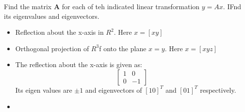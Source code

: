 Find the matrix $\boldsymbol{A}$ for each of teh indicated linear transformation $y=Ax$. IFnd its eigenvalues and eigenvectors.
\begin{itemize}
	\item Reflection about the x-axis in $R^2$. Here $x=\left[x y \right]$
	\item Orthogonal projection of $R^3$f onto the plane $x=y$. Here $x=\left[x y z\right]$
\end{itemize}
\begin{itemize}
	\item The reflection about the x-axis is given as:
	\begin{equation*}
	\boxed{
		\begin{bmatrix}
			1&0\\0&-1
		\end{bmatrix}
		}
	\end{equation*}
	Its eigen values are $\pm 1$ and eigenvectors of $\left[1 0\right]^T$ and $\left[0 1\right]^T$ respectively.

	\item 
\end{itemize}